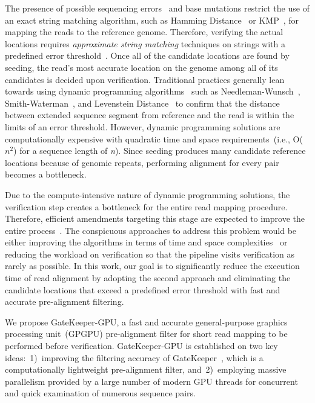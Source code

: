 The presence of possible sequencing errors~\cite{shendure2008next} and base mutations restrict the use of an exact string matching algorithm, such as Hamming Distance~\cite{hamming1950error} or KMP~\cite{knuth1977fast}, for mapping the reads to the reference genome. Therefore, verifying the actual locations requires \textit{approximate string matching} techniques on strings with a predefined error threshold~\cite{alser2020accelerating}. Once all of the candidate locations are found by seeding, the read's most accurate location on the genome among all of its candidates is decided upon verification. Traditional practices generally lean towards using dynamic programming algorithms~\cite{alser2021technology} such as Needleman-Wunsch~\cite{needleman1970general}, Smith-Waterman~\cite{Smith1981}, and Levenstein Distance~\cite{levenshtein1966binary} to confirm that the distance between extended sequence segment from reference and the read is within the limits of an error threshold. However, dynamic programming solutions are computationally expensive with quadratic time and space requirements~(i.e., O($n^2$) for a sequence length of \textit{n}). Since seeding produces many candidate reference locations because of genomic repeats, performing alignment for every pair becomes a bottleneck. 

Due to the compute-intensive nature of dynamic programming solutions, the verification step creates a bottleneck for the entire read mapping procedure. Therefore, efficient amendments targeting this stage are expected to improve the entire process~\cite{alser2020accelerating}. The conspicuous approaches to address this problem would be either improving the algorithms in terms of time and space complexities~\cite{myers1999fast, zhang2000greedy} or reducing the workload on verification so that the pipeline visits verification as rarely as possible. In this work, our goal is to significantly reduce the execution time of read alignment by adopting the second approach and eliminating the candidate locations that exceed a predefined error threshold with fast and accurate pre-alignment filtering.
 
We propose GateKeeper-GPU, a fast and accurate general-purpose graphics processing unit~(GPGPU) pre-alignment filter for short read mapping to be performed before verification. GateKeeper-GPU is established on two key ideas:~1)~improving the filtering accuracy of GateKeeper~\cite{Alser2017}, which is a computationally lightweight pre-alignment filter, and~2)~employing massive parallelism provided by a large number of modern GPU threads for concurrent and quick examination of numerous sequence pairs. 
 
